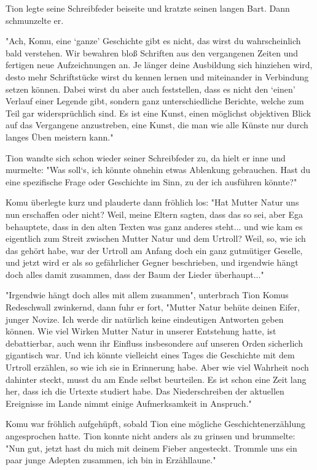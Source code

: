 \documentclass[10pt, a4paper, oneside]{book}
\begin{document}
Tion legte seine Schreibfeder beiseite und kratzte seinen langen Bart. Dann schmunzelte er.

"Ach, Komu, eine ‘ganze’ Geschichte gibt es nicht, das wirst du wahrscheinlich bald verstehen. Wir bewahren bloß Schriften aus den vergangenen Zeiten und fertigen neue Aufzeichnungen an. Je länger deine Ausbildung sich hinziehen wird, desto mehr Schriftstücke wirst du kennen lernen und miteinander in Verbindung setzen können. Dabei wirst du aber auch feststellen, dass es nicht den ‘einen’ Verlauf einer Legende gibt, sondern ganz unterschiedliche Berichte, welche zum Teil gar widersprüchlich sind. Es ist eine Kunst, einen möglichst objektiven Blick auf das Vergangene anzustreben, eine Kunst, die man wie alle Künste nur durch langes Üben meistern kann."

Tion wandte sich schon wieder seiner Schreibfeder zu, da hielt er inne und murmelte: "Was soll‘s, ich könnte ohnehin etwas Ablenkung gebrauchen. Hast du eine spezifische Frage oder Geschichte im Sinn, zu der ich ausführen könnte?"

Komu überlegte kurz und plauderte dann fröhlich los: "Hat Mutter Natur uns nun erschaffen oder nicht? Weil, meine Eltern sagten, dass das so sei, aber Ega behauptete, dass in den alten Texten was ganz anderes steht... und wie kam es eigentlich zum Streit zwischen Mutter Natur und dem Urtroll? Weil, so, wie ich das gehört habe, war der Urtroll am Anfang doch ein ganz gutmütiger Geselle, und jetzt wird er als so gefährlicher Gegner beschrieben, und irgendwie hängt doch alles damit zusammen, dass der Baum der Lieder überhaupt..."

"Irgendwie hängt doch alles mit allem zusammen", unterbrach Tion Komus Redeschwall zwinkernd, dann fuhr er fort, "Mutter Natur behüte deinen Eifer, junger Novize. Ich werde dir natürlich keine eindeutigen Antworten geben können. Wie viel Wirken Mutter Natur in unserer Entstehung hatte, ist debattierbar, auch wenn ihr Einfluss insbesondere auf unseren Orden sicherlich gigantisch war. Und ich könnte vielleicht eines Tages die Geschichte mit dem Urtroll erzählen, so wie ich sie in Erinnerung habe. Aber wie viel Wahrheit noch dahinter steckt, musst du am Ende selbst beurteilen. Es ist schon eine Zeit lang her, dass ich die Urtexte studiert habe. Das Niederschreiben der aktuellen Ereignisse im Lande nimmt einige Aufmerksamkeit in Anspruch."

Komu war fröhlich aufgehüpft, sobald Tion eine mögliche Geschichtenerzählung angesprochen hatte. Tion konnte nicht anders als zu grinsen und brummelte: "Nun gut, jetzt hast du mich mit deinem Fieber angesteckt. Trommle uns ein paar junge Adepten zusammen, ich bin in Erzähllaune."
\end{document}
